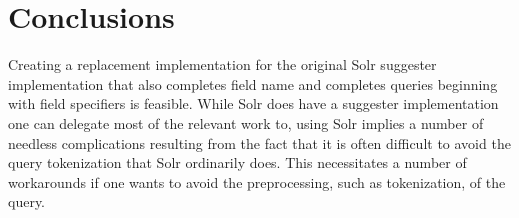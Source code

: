\section{Conclusions}\label{conclusions}

Creating a replacement implementation for the original Solr suggester implementation that also completes field name and completes queries beginning with field specifiers is feasible. While Solr does have a suggester implementation one can delegate most of the relevant work to, using Solr implies a number of needless complications resulting from the fact that it is often difficult to avoid the query tokenization that Solr ordinarily does. This necessitates a number of workarounds if one wants to avoid the preprocessing, such as tokenization, of the query. 